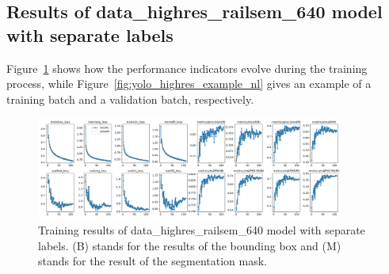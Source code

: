 \documentclass[Master,MDS,english]{BASE/twbook} %
\begin{document}

\subsection{Results of data\_highres\_railsem\_640 model with separate labels}

Figure~\ref{fig:training_highres_nl} shows how the performance indicators evolve during the training process, while Figure~\ref{fig:yolo_highres_example_nl} gives an example of a training batch and a validation batch, respectively.


\begin{figure}[H]
\centering
\includegraphics[width=0.9\textwidth]{images/yolo/highres/results}
\caption{Training results of data\_highres\_railsem\_640 model with separate labels. (B) stands for the results of the bounding box and (M) stands for the result of the segmentation mask.}
\label{fig:training_highres_nl}
\end{figure}
\end{document}

